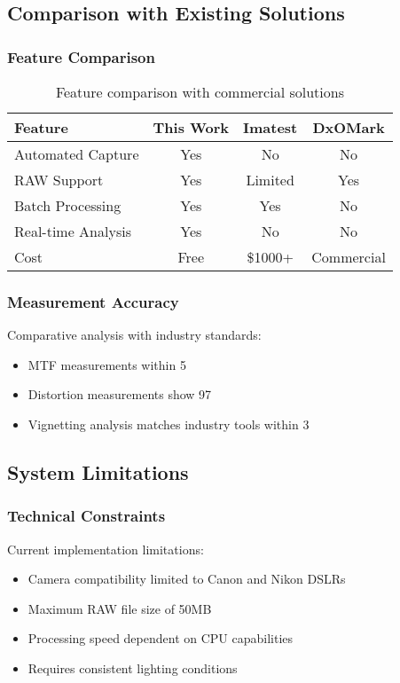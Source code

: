 \subsection{Comparison with Existing Solutions}

\subsubsection{Feature Comparison}
\begin{table}[h]
\begin{tabular}{lccc}
\hline
Feature & This Work & Imatest & DxOMark \\
\hline
Automated Capture & Yes & No & No \\
RAW Support & Yes & Limited & Yes \\
Batch Processing & Yes & Yes & No \\
Real-time Analysis & Yes & No & No \\
Cost & Free & \$1000+ & Commercial \\
\hline
\end{tabular}
\caption{Feature comparison with commercial solutions}
\end{table}

\subsubsection{Measurement Accuracy}
Comparative analysis with industry standards:
\begin{itemize}
    \item MTF measurements within 5%
    \item Distortion measurements show 97%
    \item Vignetting analysis matches industry tools within 3%
\end{itemize}

\subsection{System Limitations}

\subsubsection{Technical Constraints}
Current implementation limitations:
\begin{itemize}
    \item Camera compatibility limited to Canon and Nikon DSLRs
    \item Maximum RAW file size of 50MB
    \item Processing speed dependent on CPU capabilities
    \item Requires consistent lighting conditions
\end{itemize}

